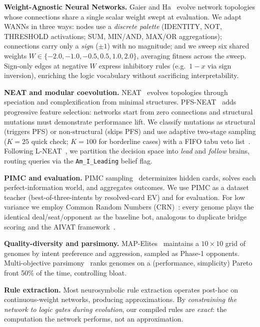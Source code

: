\documentclass[runningheads]{llncs}
\begin{document}
\textbf{Weight-Agnostic Neural Networks.} Gaier and
Ha~\cite{gaier2019wann} evolve network topologies whose connections share a
single scalar weight swept at evaluation. We adapt WANNs in three ways: nodes
use a \emph{discrete palette} (IDENTITY, NOT, THRESHOLD activations; SUM, MIN/AND,
MAX/OR aggregations); connections carry only a \emph{sign} ($\pm 1$) with no
magnitude; and we sweep six shared weights $W \in \{-2.0, -1.0, -0.5, 0.5,
1.0, 2.0\}$, averaging fitness across the sweep. Sign-only edges at negative
$W$ express inhibitory rules (e.g.\ $1-x$ via sign inversion), enriching the
logic vocabulary without sacrificing interpretability.

\textbf{NEAT and modular coevolution.} NEAT~\cite{stanley2002neat} evolves
topologies through speciation and complexification from minimal structures.
PFS-NEAT~\cite{whiteson2005pfs} adds progressive feature selection: networks
start from zero connections and structural mutations must demonstrate
performance lift. We classify mutations as structural (triggers PFS) or
non-structural (skips PFS) and use adaptive two-stage sampling ($K{=}25$ quick
check; $K{=}100$ for borderline cases) with a FIFO tabu veto
list~\cite{glover1989tabu}. Following L-NEAT~\cite{reisinger2004modular}, we
partition the decision space into \emph{lead} and \emph{follow} brains, routing
queries via the \texttt{Am\_I\_Leading} belief flag.

\textbf{PIMC and evaluation.} PIMC sampling~\cite{frank1998search} determinizes
hidden cards, solves each perfect-information world, and aggregates outcomes.
We use PIMC as a dataset teacher (best-of-three-intents by resolved-card EV)
and for evaluation. For low variance we employ Common Random Numbers
(CRN)~\cite{law2000simulation}: every genome plays the identical
deal/seat/opponent as the baseline bot, analogous to duplicate bridge scoring
and the AIVAT framework~\cite{burch2018aivat}.

\textbf{Quality-diversity and parsimony.} MAP-Elites~\cite{mouret2015mapelites}
maintains a $10\times 10$ grid of genomes by intent preference and aggression,
sampled as Phase-1 opponents. Multi-objective parsimony~\cite{poli2003parsimony,deb2001multiobjective}
ranks genomes on a (performance, simplicity) Pareto front 50\% of the time,
controlling bloat.

\textbf{Rule extraction.} Most neurosymbolic rule extraction operates post-hoc
on continuous-weight networks, producing approximations. By \emph{constraining
the network to logic gates during evolution}, our compiled rules are
\emph{exact}: the computation the network performs, not an approximation.
\end{document}
